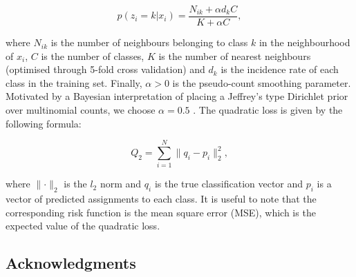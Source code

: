 \documentclass[12pt,english]{article}\usepackage[]{graphicx}\usepackage[]{color}
\begin{document}
\begin{equation}
p(z_i = k|x_i) = \frac{N_{ik} + \alpha d_k C}{K + \alpha C},
\end{equation}

where $N_{ik}$ is the number of neighbours belonging to class $k$ in
the neighbourhood of $x_i$, $C$ is the number of classes, $K$ is the
number of nearest neighbours (optimised through 5-fold cross
validation) and $d_k$ is the incidence rate of each class in the
training set. Finally, $\alpha >0$ is the pseudo-count smoothing
parameter. Motivated by a Bayesian interpretation of placing a
Jeffrey's type Dirichlet prior over multinomial counts, we choose
$\alpha = 0.5$ \citep{Hazimeh:2015, Valcarce:2016, Manning:2008}.  The
quadratic loss is given by the following formula:

\begin{equation}
  Q_2 = \sum_{i = 1}^{N}\lVert q_i - p_i\rVert_2^2,
\end{equation}

where $\lVert\cdot\rVert_2$ is the $l_2$ norm and $q_i$ is the true
classification vector and $p_i$ is a vector of predicted assignments
to each class. It is useful to note that the corresponding risk
function is the mean square error (MSE), which is the expected value
of the quadratic loss.





\subsection*{Acknowledgments}
\end{document}

